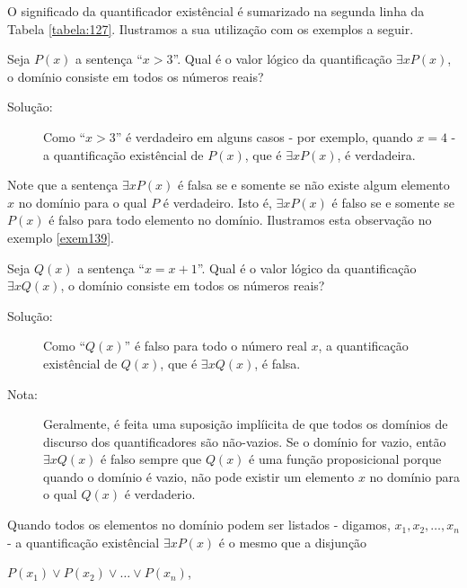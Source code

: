 O significado da quantificador existêncial é sumarizado na segunda linha da
Tabela \ref{tabela:127}. Ilustramos a sua utilização com os exemplos a seguir.

\begin{exmp}
\label{exem138}
Seja $P(x)$ a sentença ``$x>3$''. Qual é o valor lógico da quantificação
$\exists xP(x)$, o domínio consiste em todos os números reais?
\begin{description}
\item[Solução:] Como ``$x>3$'' é verdadeiro em alguns casos - por exemplo,
quando $x=4$ - a quantificação existêncial de $P(x)$, que é $\exists xP(x)$, é
verdadeira.
\end{description}
\end{exmp}

Note que a sentença $\exists xP(x)$ é falsa se e somente se não existe algum
elemento $x$ no domínio para o qual $P$ é verdadeiro. Isto é, $\exists xP(x)$ é
falso se e somente se $P(x)$ é falso para todo elemento no domínio. Ilustramos
esta observação no exemplo \ref{exem139}.

\begin{exmp}
\label{exem139}
Seja $Q(x)$ a sentença ``$x=x+1$''. Qual é o valor lógico da quantificação
$\exists xQ(x)$, o domínio consiste em todos os números reais?
\begin{description}
\item[Solução:] Como ``$Q(x)$'' é falso para todo o número real $x$, a
quantificação existêncial de $Q(x)$, que é $\exists xQ(x)$, é falsa.
\end{description}
\end{exmp}

\begin{description}
\item[Nota:] Geralmente, é feita uma suposição implíicita de que todos os
domínios de discurso dos quantificadores são não-vazios. Se o domínio for vazio,
então $\exists xQ(x)$ é falso sempre que $Q(x)$ é uma função proposicional
porque quando o domínio é vazio, não pode existir um elemento $x$ no domínio
para o qual $Q(x)$ é verdaderio.
\end{description}

Quando todos os elementos no domínio podem ser listados - digamos, $x_1, x_2,
\ldots, x_n$ - a quantificação existêncial $\exists xP(x)$ é o mesmo que a
disjunção

\begin{center}
$P(x_1) \lor P(x_2) \lor \ldots \lor P(x_n)$,
\end{center}

